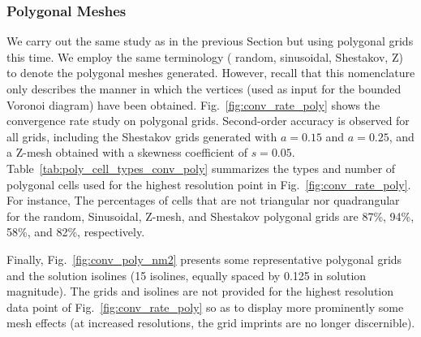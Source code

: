 \documentclass[preprint,10pt]{elsarticle}
\newcommand{\fig}[1]{Fig.~\ref{#1}}                      %
\newcommand{\tbl}[1]{Table~\ref{#1}}                     %
\begin{document}
\pagebreak
\newpage
\pagebreak
\newpage


\subsubsection{Polygonal Meshes} \label{sec:results_conv_poly}

We carry out the same study as in the previous Section but using polygonal grids this time. We employ the same terminology (
random, sinusoidal, Shestakov, Z) to denote the polygonal meshes generated. However, recall that this nomenclature 
only describes the manner in which the vertices (used as input for the bounded Voronoi diagram) have been obtained.
%
\fig{fig:conv_rate_poly} shows the convergence rate study on polygonal grids. Second-order accuracy is observed for all 
grids, including the Shestakov grids generated with $a=0.15$ and $a=0.25$, and a Z-mesh obtained with a skewness 
coefficient of $s=0.05$.
\tbl{tab:poly_cell_types_conv_poly} summarizes the types and number of polygonal cells used for the highest resolution point in 
\fig{fig:conv_rate_poly}. For instance, The percentages of cells that are not triangular nor quadrangular for the random, Sinusoidal, 
Z-mesh, and Shestakov polygonal grids are 87\%, 94\%, 58\%, and 82\%, respectively.

Finally, \fig{fig:conv_poly_nm2} presents some representative polygonal grids and the solution isolines (15 isolines, equally spaced by 0.125 in solution magnitude). The grids and isolines are not provided for the highest resolution data point of \fig{fig:conv_rate_poly} so as to display more prominently some mesh effects (at increased resolutions, the grid imprints are no longer discernible).
\end{document}
